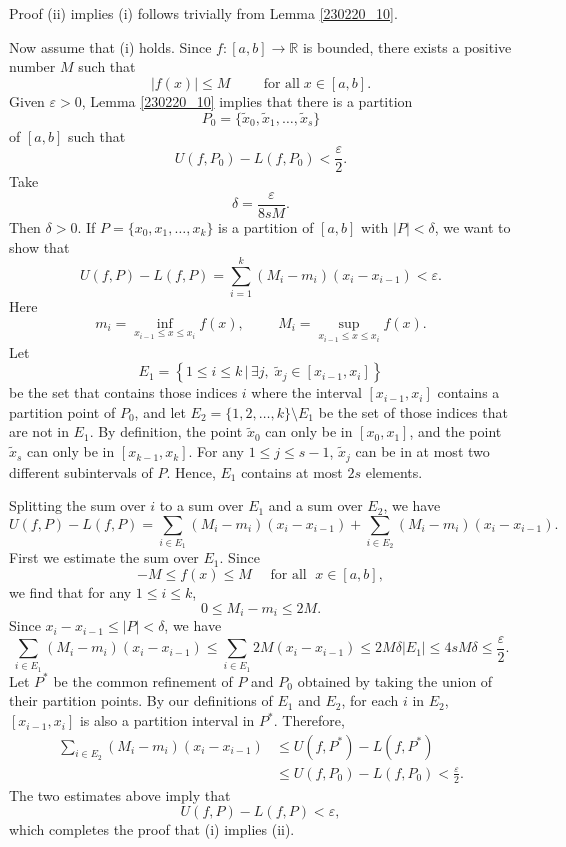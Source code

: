 \begin{myproof}{Proof}
 (ii) implies (i) follows trivially from  Lemma  \ref{230220_10}.

  

Now assume that (i) holds.
Since $f:[a,b]\to\mathbb{R}$ is bounded, there exists a positive number $M$ such that
\[|f(x)|\leq M\hspace{1cm}\text{for all}\;x\in [a,b].\]
Given $\varepsilon>0$,  Lemma \ref{230220_10} implies that  there is a partition \[P_0=\{\widetilde{x}_0, \widetilde{x}_1, \ldots, \widetilde{x}_s\}\] of $[a,b]$ such that
\[U(f,P_0)-L(f,P_0)<\frac{\varepsilon}{2}.\]
Take
\[\delta=\frac{\varepsilon}{8sM}.\] Then $\delta>0$. If $P=\{x_0, x_1, \ldots, x_k\}$ is a partition of $[a,b]$ with $|P|<\delta$, we want to show that
\[U(f, P)-L(f,P)=\sum_{i=1}^k(M_i-m_i)(x_i-x_{i-1})<\varepsilon.\]
Here\[m_i=\inf_{x_{i-1}\leq x\leq x_i}f(x),\hspace{1cm}M_i=\sup_{x_{i-1}\leq x\leq x_i}f(x).\]   
 Let
\[E_1=\left\{1\leq i\leq k\,|\, \exists j,\;\widetilde{x}_j\in [x_{i-1}, x_i]\right\}\]
be the set that contains those indices $i$ where the interval $[x_{i-1}, x_i]$ contains a partition point of $P_0$, and
let $E_2=\{1, 2, \ldots, k\}\setminus E_1$ be the set of those indices that are not in $E_1$. 
\bp
  By definition, the point $\widetilde{x}_0$ can only be in $[x_0, x_1]$, and the point $\widetilde{x}_s$ can only be in $[x_{k-1}, x_k]$. For any $1\leq j\leq s-1$, $\widetilde{x}_j$ can be in at most two different subintervals of $P$. Hence, $E_1 $ contains at most $2s$ elements.
 
 

Splitting the sum over $i$ to a sum over $E_1$ and a sum over $E_2$, we have
\[U(f,P)-L(f,P)=\sum_{i\in E_1}(M_i-m_i)(x_i-x_{i-1})+\sum_{i\in E_2}(M_i-m_i)(x_i-x_{i-1}).\] 
First we estimate the sum over $E_1$. 
 Since \[-M\leq f(x)\leq M\quad\text{ for all }\;x\in [a,b],\] we find that for any $1\leq i\leq k$,
\[0\leq M_i-m_i\leq 2M.\]
Since $x_i-x_{i-1}\leq|P|<\delta$, we have 
\[\sum_{i\in E_1}(M_i-m_i)(x_i-x_{i-1})\leq \sum_{i\in E_1}2M(x_i-x_{i-1})\leq 2M\delta |E_1|\leq 4sM\delta \leq\frac{\varepsilon}{2}.\]Let $P^*$ be the common refinement of $P$ and $P_0$ obtained by taking the union of their partition points. By our definitions of $E_1$ and $E_2$, for each $i$ in $E_2$, $[x_{i-1}, x_i]$ is also a partition interval in $P^*$. 
 Therefore,
\begin{align*} \sum_{i\in E_2}\left(M_i-m_i\right)(x_i-x_{i-1}) &\leq U(f,P^*)-L(f,P^*)\\&\leq U(f,P_0)-L(f,P_0)<\frac{\varepsilon}{2}.\end{align*}
 The two estimates above imply that
\[U(f,P)-L(f,P)<  \varepsilon,\]
which completes the proof that (i)  implies (ii).
\end{myproof}


